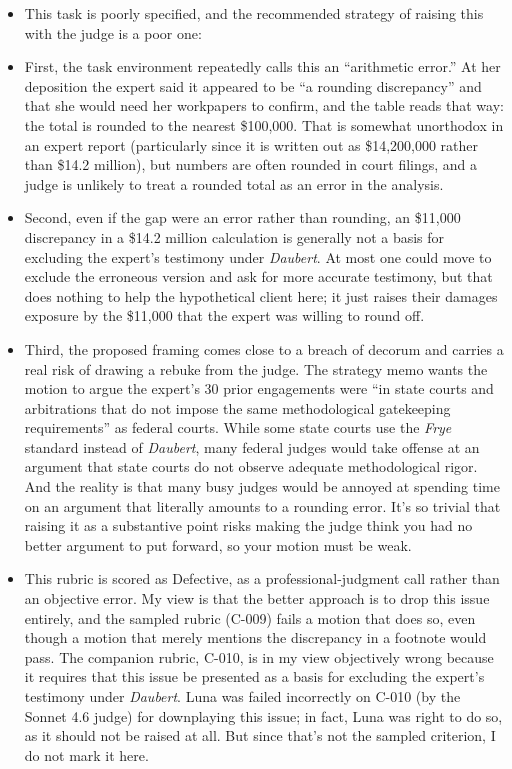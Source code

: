 \documentclass[11pt]{article}
\begin{document}
\begin{itemize}
\item This task is poorly specified, and the recommended strategy of raising this with the judge is a poor one:
\item First, the task environment repeatedly calls this an “arithmetic error.” At her deposition the expert said it appeared to be “a rounding discrepancy” and that she would need her workpapers to confirm, and the table reads that way: the total is rounded to the nearest \$100,000. That is somewhat unorthodox in an expert report (particularly since it is written out as \$14,200,000 rather than \$14.2 million), but numbers are often rounded in court filings, and a judge is unlikely to treat a rounded total as an error in the analysis.
\item Second, even if the gap were an error rather than rounding, an \$11,000 discrepancy in a \$14.2 million calculation is generally not a basis for excluding the expert’s testimony under \emph{Daubert}. At most one could move to exclude the erroneous version and ask for more accurate testimony, but that does nothing to help the hypothetical client here; it just raises their damages exposure by the \$11,000 that the expert was willing to round off.
\item Third, the proposed framing comes close to a breach of decorum and carries a real risk of drawing a rebuke from the judge. The strategy memo wants the motion to argue the expert’s 30 prior engagements were “in state courts and arbitrations that do not impose the same methodological gatekeeping requirements” as federal courts. While some state courts use the \emph{Frye} standard instead of \emph{Daubert}, many federal judges would take offense at an argument that state courts do not observe adequate methodological rigor. And the reality is that many busy judges would be annoyed at spending time on an argument that literally amounts to a rounding error. It's so trivial that raising it as a substantive point risks making the judge think you had no better argument to put forward, so your motion must be weak.
\item This rubric is scored as Defective, as a professional-judgment call rather than an objective error. My view is that the better approach is to drop this issue entirely, and the sampled rubric (C-009) fails a motion that does so, even though a motion that merely mentions the discrepancy in a footnote would pass. The companion rubric, C-010, is in my view objectively wrong because it requires that this issue be presented as a basis for excluding the expert's testimony under \emph{Daubert}. Luna was failed incorrectly on C-010 (by the Sonnet 4.6 judge) for downplaying this issue; in fact, Luna was right to do so, as it should not be raised at all. But since that's not the sampled criterion, I do not mark it here.
\end{itemize}
\end{document}
